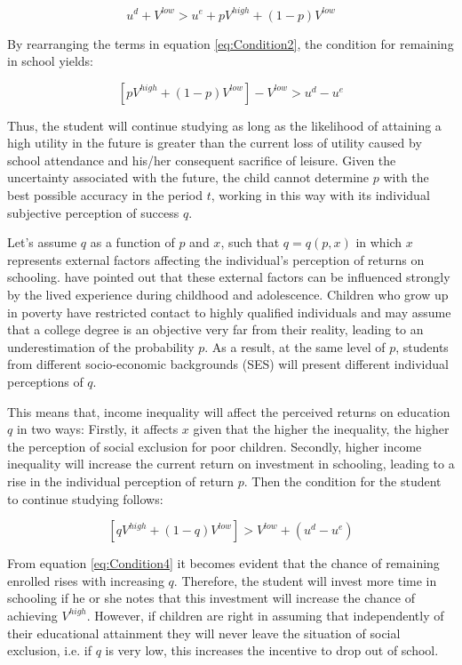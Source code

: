 \documentclass[a4paper, 12pt]{article}
\begin{document}
\begin{equation} \label{eq:Condition2} 
u^d + V^{low} > u^e + pV^{high} + (1-p)V^{low}
\end{equation}

By rearranging the terms in equation \eqref{eq:Condition2}, the condition for remaining in school yields:


\begin{equation} \label{eq:Condition3} 
\left[pV^{high} + (1-p)V^{low} \right] - V^{low} > u^d - u^e  
\end{equation}

Thus, the student will continue studying as long as the likelihood of attaining a high utility in the future is greater than the current loss of utility caused by school attendance and his/her consequent sacrifice of leisure. Given the uncertainty associated with the future, the child cannot determine $p$ with the best possible accuracy in the period $t$, working in this way with its individual subjective perception of success $q$. 

Let's assume $q$ as a function of $p$ and $x$, such that $q=q(p,x)$ in which $x$ represents external factors affecting the individual's perception of returns on schooling. \citet{kearney2014income} have pointed out that these external factors can be influenced strongly by the lived experience during childhood and adolescence. Children who grow up in poverty have restricted contact to highly qualified individuals and may assume that a college degree is an objective very far from their reality, leading to an underestimation of the probability $p$. As a result, at the same level of $p$, students from different socio-economic backgrounds (SES) will present different individual perceptions of $q$.

This means that, income inequality will affect the perceived returns on education $q$ in two ways: Firstly, it affects $x$ given that the higher the inequality, the higher the perception of social exclusion for poor children. Secondly, higher income inequality will increase the current return on investment in schooling, leading to a rise in the individual perception of return $p$. Then the condition for the student to continue studying follows:


\begin{equation} \label{eq:Condition4} 
\left[qV^{high} + (1-q)V^{low} \right] > V^{low} + (u^d - u^e) 
\end{equation}


From equation \eqref{eq:Condition4} it becomes evident that the chance of remaining enrolled rises with increasing $q$. Therefore, the student will invest more time in schooling if he or she notes that this investment will increase the chance of achieving $V^{high}$. However, if children are right in assuming that independently of their educational attainment they will never leave the situation of social exclusion, i.e. if $q$ is very low, this increases the incentive to drop out of school.
\end{document}
